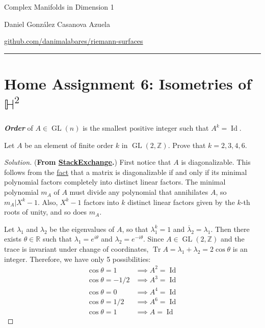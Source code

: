 \documentclass{article}
\newcommand{\R}{\mathbb{R}}
\newcommand{\Z}{\mathbb{Z}}
\renewcommand{\H}{\mathbb{H}}
\DeclareMathOperator{\Id}{Id}
\DeclareMathOperator{\Tr}{Tr}
\DeclareMathOperator{\GL}{GL}
\begin{document}
\begin{minipage}{\textwidth}
	\begin{minipage}{.5\textwidth}
		Complex Manifolds in Dimension 1\\
	\end{minipage}%
	\begin{minipage}{.5\textwidth}
		\raggedleft
		Daniel González Casanova Azuela\par
		{\small\href{https://github.com/danimalabares/riemann-surfaces}{github.com/danimalabares/riemann-surfaces}}
	\end{minipage}%
\end{minipage}\vspace{.2cm}\hrule
\section{Home Assignment 6: Isometries of $\H^2$}
\setcounter{section}{6}
\begin{defn}
	\textbf{\textit{Order}} of $A\in\GL(n)$ is the smallest positive integer such that $A^k=\Id$.
\end{defn}
\begin{exercise}
	Let $A$ be an element of finite order $k$ in $\GL(2,\Z)$. Prove that $k=2,3,4,6$.
\end{exercise}
\begin{proof}[Solution]
	(\textbf{From \href{https://math.stackexchange.com/questions/3759724/show-that-an-element-of-gl-2-mathbbz-has-order-1-2-3-4-6-or-infty}{StackExchange}.}) 
	First notice that $A$ is diagonalizable. This follows from the \href{https://en.wikipedia.org/wiki/Minimal_polynomial_(linear_algebra)#Applications}{fact} that a matrix is diagonalizable if and only if its minimal polynomial factors completely into distinct linear factors. The minimal polynomial $m_A$ of $A$ must divide any polynomial that annihilates $A$, so $m_A|X^k-1$. Also, $X^k-1$ factors into $k$ distinct linear factors given by the $k$-th roots of unity, and so does $m_A$.
	
	Let $\lambda_1$ and $\lambda_2$ be the eigenvalues of $A$, so that $\lambda_1^k=1$ and $\overline{\lambda}_2=\lambda_1$. Then there exists $\theta\in\R$ such that $\lambda_1=e^{i\theta}$ and $\lambda_2=e^{-i\theta}$. Since $A\in\GL(2,\Z)$ and the trace is invariant under change of coordinates, $\Tr A=\lambda_1+\lambda_2=2\cos\theta$ is an integer. Therefore, we have only 5 possibilities:
	\begin{align*}
		\cos\theta=1&\implies A^2=\Id\\
		\cos\theta=-1/2&\implies A^3=\Id\\
		\cos\theta=0&\implies A^4=\Id\\
		\cos\theta=1/2&\implies A^6=\Id\\
		\cos\theta=1&\implies A=\Id
	\end{align*}
\end{proof}
\end{document}
